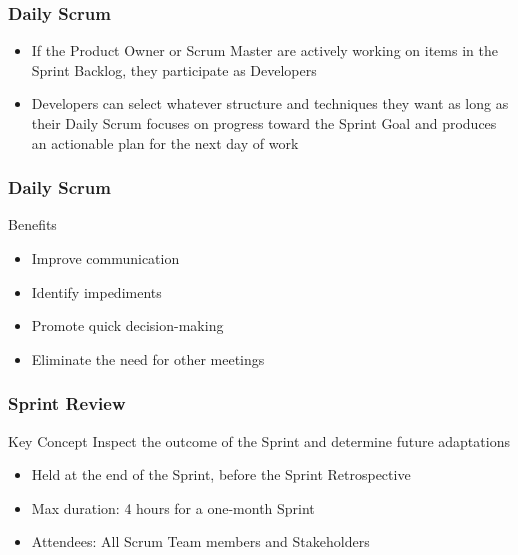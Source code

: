 \begin{frame}
	\frametitle{Daily Scrum}
	\begin{itemize}
		\setlength\itemsep{0.7em}
		\item If the Product Owner or Scrum Master are actively working on items in the Sprint Backlog, they participate as Developers
		\item Developers can select whatever structure and techniques they want as long as their Daily Scrum focuses on progress toward the Sprint Goal and produces an actionable plan for the next day of work
	\end{itemize}
\end{frame}

\begin{frame}
	\frametitle{Daily Scrum}
	\begin{exampleblock}{Benefits}
		\begin{itemize}
			\item Improve communication
			\item Identify impediments
			\item Promote quick decision-making
			\item Eliminate the need for other meetings
		\end{itemize}
	\end{exampleblock}
\end{frame}

\begin{frame}
	\frametitle{Sprint Review}
	\begin{block}{Key Concept}
		Inspect the outcome of the Sprint and determine future adaptations
	\end{block}
	\vspace{0.5em}
	\begin{itemize}
		\setlength\itemsep{0.7em}
		\item Held at the end of the Sprint, before the Sprint Retrospective
		\item Max duration: 4 hours for a one-month Sprint
		\item Attendees: All Scrum Team members and Stakeholders
	\end{itemize}
\end{frame}

